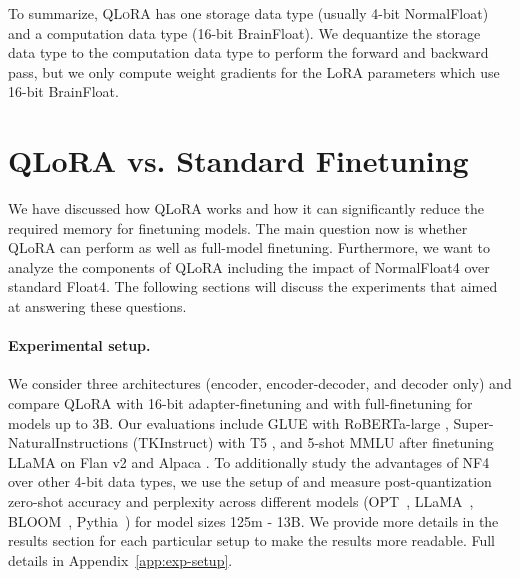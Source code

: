 \documentclass{article}
\newcommand{\method}{\textsc{QLoRA}\xspace}
\begin{document}
To summarize, \method has one storage data type (usually 4-bit NormalFloat) and a computation data type (16-bit BrainFloat). We dequantize the storage data type to the computation data type to perform the forward and backward pass, but we only compute weight gradients for the LoRA parameters which use 16-bit BrainFloat.


\section{QLoRA vs. Standard Finetuning}
\label{sec:comp_to_std}



We have discussed how QLoRA works and how it can significantly reduce the required memory for finetuning models. The main question now is whether QLoRA can perform as well as full-model finetuning. Furthermore, we want to analyze the components of QLoRA including the impact of NormalFloat4 over standard Float4. The following sections will discuss the experiments that aimed at answering these questions.

\paragraph{Experimental setup.} 
We consider three architectures (encoder, encoder-decoder, and decoder only) and compare QLoRA with 16-bit adapter-finetuning and with full-finetuning for models up to 3B. Our evaluations include GLUE \citep{wang2018glue} with RoBERTa-large \citep{liu2019roberta},  Super-NaturalInstructions (TKInstruct) \citep{wang2022super} with T5 \citep{t5}, and 5-shot MMLU \citep{hendrycksmeasuring} after finetuning LLaMA on Flan v2 \citep{longpre2023flan} and Alpaca \citep{alpaca}. 
To additionally study the advantages of NF4 over other 4-bit data types, we use the setup of \citet{dettmers2022case} and measure post-quantization zero-shot accuracy and perplexity across different models (OPT~\citep{zhang2022opt}, LLaMA~\citep{touvron2023llama}, BLOOM~\citep{scao2022bloom}, Pythia~\citep{biderman2023pythia}) for model sizes 125m - 13B. 
We provide more details in the results section for each particular setup to make the results more readable. Full details in Appendix~\ref{app:exp-setup}.
\end{document}
